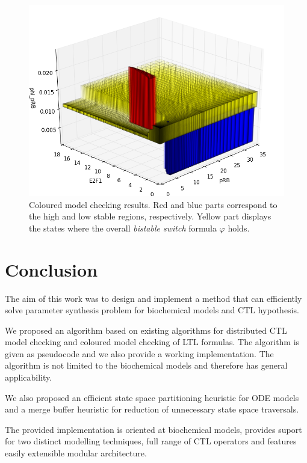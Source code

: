\documentclass[12pt,oneside,draft]{fithesis2}
\begin{document}
\begin{figure}
\begin{center}
\includegraphics[scale=.35]{3d.png}
\end{center}
\vspace*{-0.5em}
\caption{Coloured model checking results. Red and blue parts
  correspond to the high and low stable regions, respectively. Yellow part
  displays the states where the overall \emph{bistable switch} formula $\varphi$
  holds.}
\label{fig:3dresults}
\end{figure}

	\chapter{Conclusion}
		
		The aim of this work was to design and implement a method that can efficiently solve parameter synthesis problem for biochemical models and CTL hypothesis. 
		
		We proposed an algorithm based on existing algorithms for distributed CTL model checking and coloured model checking of LTL formulas. The algorithm is given as pseudocode and we also provide a working implementation. The algorithm is not limited to the biochemical models and therefore has general applicability.

		We also proposed an efficient state space partitioning heuristic for ODE models and a merge buffer heuristic for reduction of unnecessary state space traversals.
				
		The provided implementation is oriented at biochemical models, provides suport for two distinct modelling techniques, full range of CTL operators and features easily extensible modular architecture.
		
\end{document}

